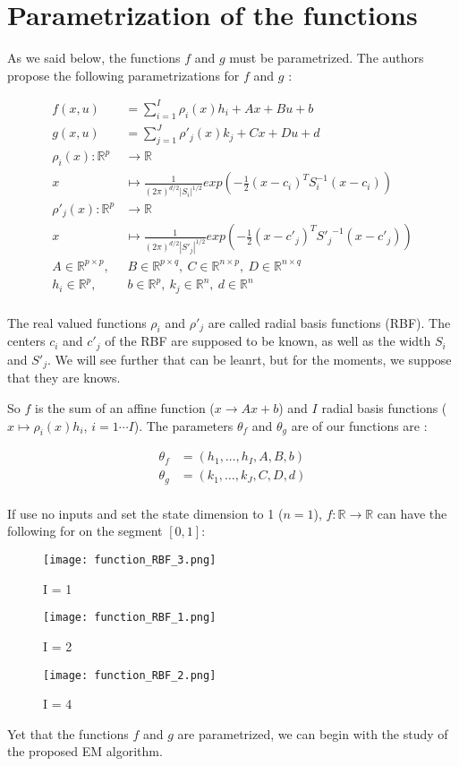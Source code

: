 \section{Parametrization of the functions}

As we said below, the functions $f$ and $g$ must be parametrized.
The authors propose the following parametrizations for $f$ and $g$ :

\begin{align*}
  f(x,u) &= \sum_{i=1}^I \rho_i(x) h_i + Ax + Bu + b\\
  g(x,u) &= \sum_{j=1}^J \rho'_j(x) k_j + Cx + Du + d\\
  \rho_i(x) \colon \mathbb{R}^p &\to \mathbb{R}\\
  x &\mapsto \frac{1}{(2\pi)^{d/2}|S_i|^{1/2}} exp\left(-\frac{1}{2}(x-c_i)^T S_{i}^{-1}(x-c_i)\right)\\
  \rho'_j(x) \colon \mathbb{R}^p &\to \mathbb{R}\\
  x &\mapsto \frac{1}{(2\pi)^{d/2}|S'_j|^{1/2}} exp\left(-\frac{1}{2}(x-c'_j)^T {S'_{j}}^{-1}(x-c'_j)\right)\\
  A \in \mathbb{R}^{p \times p}, & \  B \in \mathbb{R}^{p \times q}, \  C \in \mathbb{R}^{n \times p}, \  D \in \mathbb{R}^{n \times q}\\
  h_i \in \mathbb{R}^{p},& \  b \in \mathbb{R}^p, \  k_j \in \mathbb{R}^{n},\   d \in \mathbb{R}^n\\
\end{align*}

The real valued functions $\rho_i$ and $\rho'_j$ are called radial basis functions (RBF).
The centers $c_i$ and $c'_j$ of the RBF are supposed to be known, as well as the width $S_i$ and $S'_j$.
We will see further that can be leanrt, but for the moments, we suppose that they are knows.


So $f$ is the sum of an affine function ($x \rightarrow Ax + b$) and $I$ radial basis functions ($x \mapsto \rho_i(x) h_i$, $i=1 \cdots I$).
The parameters $\theta_f$ and $\theta_g$ are of our functions are :

\begin{align*}
  \theta_f &= \left( h_1, \ldots , h_I, A, B, b\right) \\
  \theta_g &= \left( k_1, \ldots , k_J, C, D, d\right) \\
\end{align*}

If use no inputs and set the state dimension to 1 ($n = 1$), $f : \mathbb{R} \to \mathbb{R}$ can have the following for on the segment $\left [ 0 , 1 \right ]$:

\begin{figure}[H]
\captionsetup{labelformat=empty}
  \texttt{[image: function\_RBF\_3.png]}
  \caption{I = 1}
\endminipage\hfill
{}
  \texttt{[image: function\_RBF\_1.png]}
  \caption{I = 2}
\endminipage\hfill
{}
  \texttt{[image: function\_RBF\_2.png]}
  \caption{I = 4}
\endminipage\hfill
\end{figure}

Yet that the functions $f$ and $g$ are parametrized, we can begin with the study of the proposed EM algorithm.
